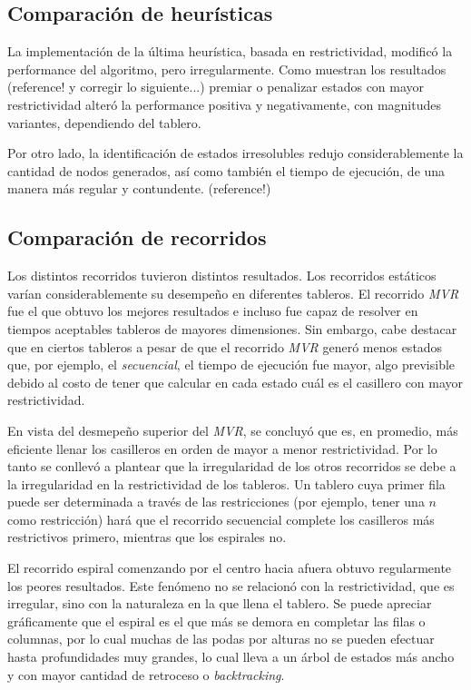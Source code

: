 \documentclass[%
    final,
    reprint,
    notitlepage,
    narroweqnarray,
    inline,
    twoside,
    invited
    ]{ieee}
\begin{document}
\subsection{Comparación de heurísticas}


\par La implementación de la última heurística, basada en restrictividad, modificó la performance del algoritmo, pero irregularmente. 
Como muestran los resultados (reference! y corregir lo siguiente...) premiar o penalizar estados con mayor restrictividad alteró la performance 
positiva y negativamente, con magnitudes variantes, dependiendo del tablero. 
\par Por otro lado, la identificación de estados irresolubles redujo considerablemente la cantidad de nodos generados, así como también el tiempo de ejecución, 
de una manera más regular y contundente.
(reference!)

\subsection{Comparación de recorridos}

\par  Los distintos recorridos tuvieron distintos resultados. Los recorridos estáticos varían considerablemente su desempeño en diferentes tableros. El 
recorrido \textit{MVR} fue el que obtuvo los mejores resultados e incluso fue capaz de resolver en tiempos aceptables tableros de mayores dimensiones. 
Sin embargo, cabe destacar que en ciertos tableros a pesar de que el recorrido \textit{MVR} generó menos estados que, por ejemplo, el \textit{secuencial}, el tiempo de ejecución 
fue mayor, algo previsible debido al costo de tener que calcular en cada estado cuál es el casillero con mayor restrictividad. 
\par En vista del desmepeño superior 
del \textit{MVR}, se concluyó que es, en promedio, más eficiente llenar los casilleros en orden de mayor a menor restrictividad.
Por lo tanto se conllevó a plantear que la irregularidad de los otros recorridos se debe a la irregularidad en la restrictividad de los tableros. 
Un tablero cuya primer fila puede ser determinada a través de las restricciones (por ejemplo, tener una $n$ como restricción) hará que el recorrido secuencial 
complete los casilleros más restrictivos primero, mientras que los espirales no.
\par El recorrido espiral comenzando por el centro hacia afuera obtuvo regularmente los peores resultados. Este fenómeno no se relacionó con la restrictividad, 
que es irregular, sino con la naturaleza en la que llena el tablero. Se puede apreciar gráficamente que el espiral es el que más se demora en completar las filas 
o columnas, por lo cual muchas de las podas por alturas no se pueden efectuar hasta profundidades muy grandes, lo cual lleva a un árbol de estados más ancho y 
con mayor cantidad de retroceso o \textit{backtracking}.
\end{document}
